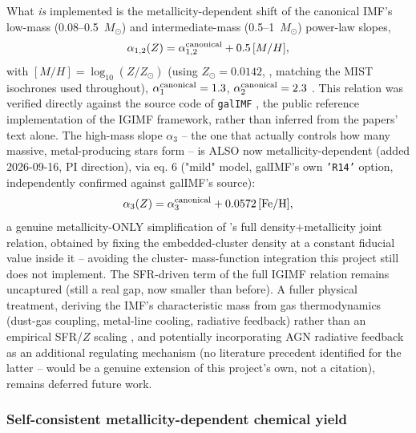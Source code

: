 \documentclass{aastex7}
\begin{document}
What \emph{is} implemented is the metallicity-dependent shift of the
canonical \citet{Kroupa2001} IMF's low-mass (0.08--0.5~$M_\odot$) and
intermediate-mass (0.5--1~$M_\odot$) power-law slopes,
\begin{equation}
    \alpha_{1,2}(Z) = \alpha_{1,2}^{\rm canonical} + 0.5\,[M/H],
\end{equation}
with $[M/H] = \log_{10}(Z/Z_\odot)$ (using $Z_\odot = 0.0142$,
\citealt{Asplund2009}, matching the MIST isochrones used throughout),
$\alpha_1^{\rm canonical}=1.3$, $\alpha_2^{\rm canonical}=2.3$
\citep{Kroupa2001}. This relation was verified directly against the source
code of \texttt{galIMF} \citep{YanJerabkovaKroupa2017,
YanJerabkovaKroupaVazdekis2019}, the public reference implementation of the
IGIMF framework, rather than inferred from the papers' text alone. The
high-mass slope $\alpha_3$ -- the one that actually controls how many
massive, metal-producing stars form -- is ALSO now metallicity-dependent
(added 2026-09-16, PI direction), via \citet{RecchiEtAl2014} eq. 6 ("mild"
model, galIMF's own \texttt{'R14'} option, independently confirmed against
galIMF's source):
\begin{equation}
    \alpha_3(Z) = \alpha_3^{\rm canonical} + 0.0572\,[{\rm Fe/H}],
\end{equation}
a genuine metallicity-ONLY simplification of \citet{MarksEtAl2012}'s full
density+metallicity joint relation, obtained by fixing the embedded-cluster
density at a constant fiducial value inside it -- avoiding the cluster-
mass-function integration this project still does not implement. The
SFR-driven term of the full IGIMF relation remains uncaptured (still a real
gap, now smaller than before). A fuller physical treatment, deriving the
IMF's characteristic mass from gas thermodynamics (dust-gas coupling,
metal-line cooling, radiative feedback) rather than an empirical SFR/$Z$
scaling \citep{ShardaKrumholz2022}, and potentially incorporating AGN
radiative feedback as an additional regulating mechanism (no literature
precedent identified for the latter -- would be a genuine extension of this
project's own, not a citation), remains deferred future work.

\subsubsection{Self-consistent metallicity-dependent chemical yield} \label{sec:metal-yield}
\end{document}
